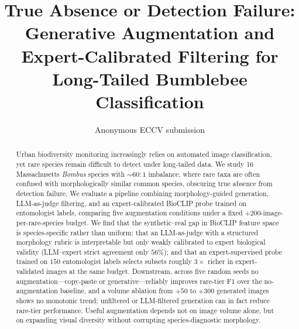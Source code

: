 \documentclass[runningheads]{llncs}
\begin{document}
\title{True Absence or Detection Failure: Generative Augmentation
and Expert-Calibrated Filtering for Long-Tailed Bumblebee
Classification}


\author{Anonymous ECCV submission}

\maketitle


\begin{abstract}
Urban biodiversity monitoring increasingly relies on automated image
classification, yet rare species remain difficult to detect under
long-tailed data. We study 16 Massachusetts \emph{Bombus} species with
$\sim$$60{:}1$ imbalance, where rare taxa are often confused with
morphologically similar common species, obscuring true absence from
detection failure. We evaluate a pipeline combining morphology-guided
generation, LLM-as-judge filtering, and an expert-calibrated BioCLIP
probe trained on entomologist labels, comparing five augmentation
conditions under a fixed $+200$-image-per-rare-species budget. We find
that the synthetic--real gap in BioCLIP feature space is
species-specific rather than uniform; that an LLM-as-judge with a
structured morphology rubric is interpretable but only weakly calibrated
to expert biological validity (LLM--expert strict agreement only
$56\%$); and that an expert-supervised probe trained on $150$
entomologist labels selects subsets roughly $3{\times}$ richer in
expert-validated images at the same budget. Downstream, across five
random seeds no augmentation---copy-paste or generative---reliably
improves rare-tier F1 over the no-augmentation baseline, and a volume
ablation from $+50$ to $+300$ generated images shows no monotonic
trend; unfiltered or LLM-filtered generation can in fact reduce
rare-tier performance. Useful augmentation depends not on image volume
alone, but on expanding visual diversity without corrupting
species-diagnostic morphology.

\end{abstract}
\end{document}
